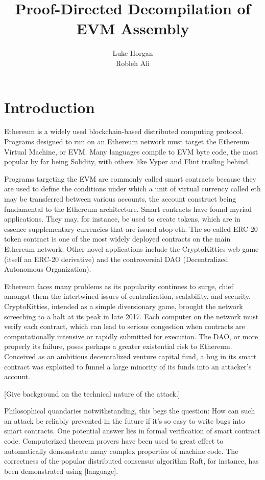 \documentclass[11pt]{article}
\title{\textbf{Proof-Directed Decompilation of EVM Assembly}}
\author{Luke Horgan\\Robleh Ali}
\date{}
\begin{document}
\maketitle

\section{Introduction}

Ethereum is a widely used blockchain-based distributed computing protocol.  Programs designed to run on an Ethereum network must target the Ethereum Virtual Machine, or EVM.  Many languages compile to EVM byte code, the most popular by far being Solidity, with others like Vyper and Flint trailing behind.

Programs targeting the EVM are commonly called smart contracts because they are used to define the conditions under which a unit of virtual currency called eth may be transferred between various accounts, the account construct being fundamental to the Ethereum architecture.  Smart contracts have found myriad applications.  They may, for instance, be used to create tokens, which are in essence supplementary currencies that are issued atop eth.  The so-called ERC-20 token contract is one of the most widely deployed contracts on the main Ethereum network.  Other novel applications include the CryptoKitties web game (itself an ERC-20 derivative) and the controversial DAO (Decentralized Autonomous Organization).

Ethereum faces many problems as its popularity continues to surge, chief amongst them the intertwined issues of centralization, scalability, and security.  CryptoKitties, intended as a simple diversionary game, brought the network screeching to a halt at its peak in late 2017.  Each computer on the network must verify each contract, which can lead to serious congestion when contracts are computationally intensive or rapidly submitted for execution.  The DAO, or more properly its failure, poses perhaps a greater existential risk to Ethereum.  Conceived as an ambitious decentralized venture capital fund, a bug in its smart contract was exploited to funnel a large minority of its funds  into an attacker’s account.

[Give background on the technical nature of the attack.]

Philosophical quandaries notwithstanding, this begs the question: How can such an attack be reliably prevented in the future if it’s so easy to write bugs into smart contracts.  One potential answer lies in formal verification of smart contract code.  Computerized theorem provers have been used to great effect to automatically demonstrate many complex properties of machine code.  The correctness of the popular distributed consensus algorithm Raft, for instance, has been demonstrated using [language].
\end{document}
